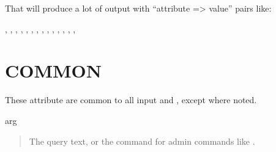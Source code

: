 \documentclass[letterpaper,10pt,english]{sphinxmanual}
\begin{document}
\sphinxAtStartPar
That will produce a lot of output with “attribute =\textgreater{} value” pairs like:

\begin{sphinxVerbatim}[commandchars=\\\{\}]
  
   \PYGZgt{} ,
   \PYGZgt{} ,
   \PYGZgt{} ,
   \PYGZgt{} ,
   \PYGZgt{} ,
   \PYGZgt{} ,
   \PYGZgt{} ,
   \PYGZgt{} ,
   \PYGZgt{} ,
   \PYGZgt{} ,
   \PYGZgt{} ,
   \PYGZgt{} ,
   \PYGZgt{} ,
   \PYGZgt{} ,
   \PYGZgt{} 
\end{sphinxVerbatim}


\section{COMMON}
\label{\detokenize{mariadb-query-digest:common}}
\sphinxAtStartPar
These attribute are common to all input {\hyperref[\detokenize{mariadb-query-digest:cmdoption-mariadb-query-digest-type}]{}} and {\hyperref[\detokenize{mariadb-query-digest:cmdoption-mariadb-query-digest-processlist}]{}},
except where noted.

\sphinxAtStartPar
arg
\begin{quote}

\sphinxAtStartPar
The query text, or the command for admin commands like .
\end{quote}
\end{document}
